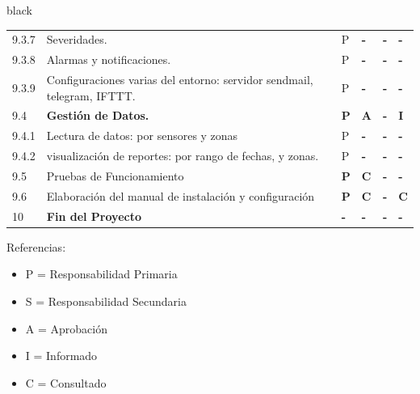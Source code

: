 \documentclass[11pt]{charter}
\begin{document}
\begin{landscape}
\begin{consigna}{black}
\begin{tabularx}{\linewidth}{@{}|p{1.3cm}|p{9.3cm}|p{3cm}|p{3cm}|p{3cm}|p{3cm}|@{}}
9.3.7                  & Severidades.                                                                                  & P          & \textbf{-} & \textbf{-} & \textbf{-} \\
9.3.8                  & Alarmas y notificaciones.                                                                     & P          & \textbf{-} & \textbf{-} & \textbf{-} \\
9.3.9                  & Configuraciones varias del   entorno: servidor sendmail, telegram, IFTTT.                     & P          & \textbf{-} & \textbf{-} & \textbf{-} \\
9.4                    & \textbf{Gestión de Datos.}                                                                    & \textbf{P} & \textbf{A} & \textbf{-} & \textbf{I} \\
9.4.1                  & Lectura de datos: por sensores y   zonas                                                      & P          & \textbf{-} & \textbf{-} & \textbf{-} \\
9.4.2                  & visualización de reportes: por   rango de fechas,  y zonas.                                   & P          & \textbf{-} & \textbf{-} & \textbf{-} \\
9.5                    & Pruebas de Funcionamiento                                                                     & \textbf{P} & \textbf{C} & \textbf{-} & \textbf{-} \\
9.6                    & Elaboración del manual de   instalación y configuración                                       & \textbf{P} & \textbf{C} & \textbf{-} & \textbf{C} \\
10                     & \textbf{Fin del Proyecto}                                                                     & \textbf{-} & \textbf{-} & \textbf{-} & \textbf{-}
\end{tabularx}

{\footnotesize
Referencias:
\begin{itemize}
	\item P = Responsabilidad Primaria
	\item S = Responsabilidad Secundaria
	\item A = Aprobación
	\item I = Informado
	\item C = Consultado
\end{itemize}
} %

%

\end{consigna}
\end{landscape}
\end{document}
